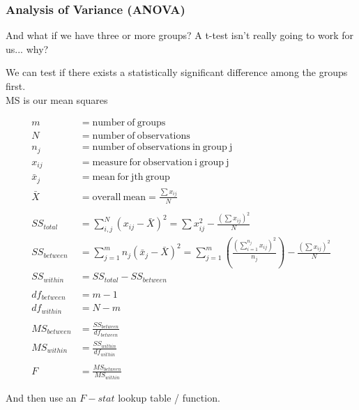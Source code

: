\documentclass{beamer} %
\begin{document}
	\begin{frame}
		\frametitle{Analysis of Variance (ANOVA)}
		And what if we have three or more groups? A t-test isn't really going to work for us... why?

		We can test if there exists a statistically significant difference among the groups first.\vspace{.125in}
		\\




			MS is our mean squares


			\begin{align*}
			    m &= \mathrm{number~of~groups} \\
			    N &= \mathrm{number~of~observations} \\
			    n_j &= \mathrm{number~of~observations~in~group~j} \\
			    x_{ij} &= \mathrm{measure~for~observation~i~group~j} \\
			    \bar{x}_j &= \mathrm{mean~for~jth~group} \\
			    \bar{X} &= \mathrm{overall~mean} = \frac{\sum x_{ij}}{N} \\
			    ~&\\
			    SS_{total} &= \sum_{i,j}^{N} (x_{ij} - \bar{X})^2 = \sum x_{ij}^2 - \frac{(\sum x_{ij})^2}{N}\\
			    SS_{between} &= \sum_{j=1}^m n_j \left(\bar{x}_j - \bar{X}\right)^2 = \sum_{j=1}^m \left( \frac{(\sum_{i=1}^{n_j} x_{ij})^2}{n_j} \right) - \frac{(\sum x_{ij})^2}{N} \\
			    SS_{within} &=  SS_{total} - SS_{between} \\
			    ~&\\
			    df_{between} &= m-1 \\
			    df_{within} &= N-m \\
			    ~&\\
			    MS_{between} &= \frac{SS_{between}}{df_{between}} \\
			    MS_{within} &= \frac{SS_{within}}{df_{within}} \\
			    ~&\\
			    F &= \frac{MS_{between}}{MS_{within}}
			\end{align*}

				And then use an $F-stat$ lookup table / function.
	\end{frame}
\end{document}
